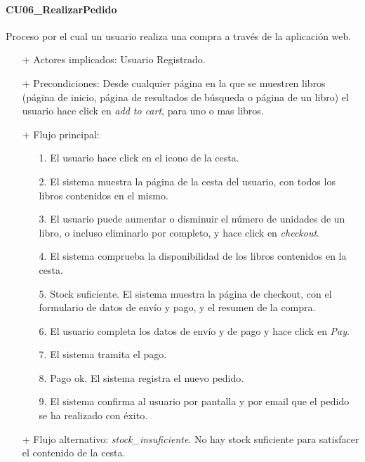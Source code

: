 \documentclass[a4paper,12pt,twoside,openright]{report}
\begin{document}
            \paragraph{CU06\_RealizarPedido}
                Proceso por el cual un usuario realiza una compra a través de la aplicación web.
                \begin{itemize}
                    \item[+] Actores implicados: Usuario Registrado.
                    \item[+] Precondiciones: Desde cualquier página en la que se muestren libros (página de inicio, página de resultados de búsqueda o página de un libro) el usuario hace click en \emph{add to cart}, para uno o mas libros.
                    \item[+] Flujo principal:
                    \begin{enumerate}
                        \item[1.] El usuario hace click en el icono de la cesta.
                        \item[2.] El sistema muestra la página de la cesta del usuario, con todos los libros contenidos en el mismo.
                        \item[3.] El usuario puede aumentar o disminuir el número de unidades de un libro, o incluso eliminarlo por completo, y hace click en \emph{checkout}.
                        \item[4.] El sistema comprueba la disponibilidad de los libros contenidos en la cesta.
                        \item[5.] Stock suficiente. El sistema muestra la página de checkout, con el formulario de datos de envío y pago, y el resumen de la compra.
                        \item[6.] El usuario completa los datos de envío y de pago y hace click en \emph{Pay}.
                        \item[7.] El sistema tramita el pago.
                        \item[8.] Pago ok. El sistema registra el nuevo pedido.
                        \item[9.] El sistema confirma al usuario por pantalla y por email que el pedido se ha realizado con éxito.
                    \end{enumerate}
                    \item[+] Flujo alternativo: \emph{stock\_insuficiente}. No hay stock suficiente para satisfacer el contenido de la cesta.
                    \begin{itemize}

\end{itemize}
\end{itemize}
\end{document}
